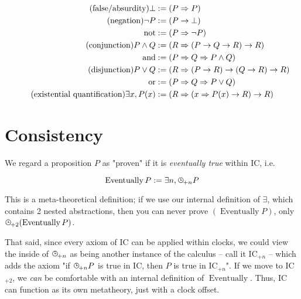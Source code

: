 \documentclass{article}
\begin{document}
  \setlength{\jot}{0.4em}
  \begin{align*}
    \tag{false/absurdity}
    \bot &:= (P \Rightarrow{P})\\
    \tag{negation}
    \neg P &:= ({P \rightarrow \bot})\\
    \mathrm{not} &:= (P \Rightarrow \neg P)\\
    \tag{conjunction}
    P \land Q &:= (R \Rightarrow (P \rightarrow Q \rightarrow R) \rightarrow R)\\
    \mathrm{and} &:= (P \Rightarrow Q \Rightarrow P \land Q)\\
    \tag{disjunction}
    P \lor Q &:= (R \Rightarrow (P \rightarrow R) \rightarrow (Q \rightarrow R) \rightarrow R)\\
    \mathrm{or} &:= (P \Rightarrow Q \Rightarrow P \lor Q)\\
    \tag{existential quantification}
    \exists x, P(x) &:= (R \Rightarrow (x \Rightarrow P(x) \rightarrow R) \rightarrow R)\\
  \end{align*}


  \section{Consistency}\label{consistency}
  
  We regard a proposition $P$ as "proven" if it is \emph{eventually true} within IC, i.e.
  
  \newcommand{\eventually}{\operatorname{\mathrm{Eventually}}}
  
  \[ \eventually P := \exists n, \clocksub{+n} P \]
  
  This is a meta-theoretical definition; if we use our internal definition of $\exists$, which contains 2 nested abstractions, then you can never prove $(\eventually P)$, only $\clocksub{+2}(\eventually P)$.
  
  That said, since every axiom of IC can be applied within clocks, we could view the inside of $\clocksub{+n}$ as being another instance of the calculus – call it IC$_{+n}$ – which adds the axiom "if $\clocksub{+n} P$ is true in IC, then $P$ is true in IC$_{+n}$". If we move to IC$_{+2}$, we \emph{can} be comfortable with an internal definition of $\eventually$. Thus, IC can function as its own metatheory, just with a clock offset.
  
\end{document}
